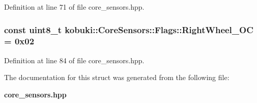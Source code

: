 \-Definition at line 71 of file core\-\_\-sensors.\-hpp.

\subsubsection[{\-Right\-Wheel\-\_\-\-O\-C}]{\setlength{\rightskip}{0pt plus 5cm}const uint8\-\_\-t {\bf kobuki\-::\-Core\-Sensors\-::\-Flags\-::\-Right\-Wheel\-\_\-\-O\-C} = 0x02\hspace{0.3cm}{\ttfamily  [static]}}\label{structkobuki_1_1CoreSensors_1_1Flags_acd0f2a4e0f3bc264289ebc67f7ef4316}


\-Definition at line 84 of file core\-\_\-sensors.\-hpp.



\-The documentation for this struct was generated from the following file\-:\begin{DoxyCompactItemize}
\item 
{\bf core\-\_\-sensors.\-hpp}\end{DoxyCompactItemize}
